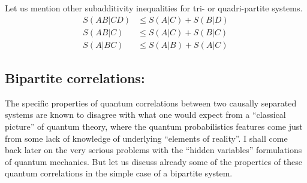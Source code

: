 Let us mention other subadditivity inequalities for tri- or quadri-partite systems.
\begin{align}
\label{ }
S(AB|CD)&\le S(A|C) + S(B|D)
\\
\label{ }
S(AB|C)&\le S(A|C) + S(B|C)
\\
\label{ }
S(A|BC)&\le S(A|B) + S(A|C)
\end{align}


%
%
%
%
%
%
%

\subsection{Bipartite correlations:}
The specific properties of quantum correlations between two causally separated systems are known to disagree with
what one would expect from a ``classical picture'' of quantum theory, where the quantum probabilistics features come just from some lack of knowledge of underlying ``elements of reality''.
I shall come back later on the very serious problems with the ``hidden variables'' formulations of quantum mechanics.
But let us discuss already some of the properties of these quantum correlations in the simple case of a bipartite system. 

